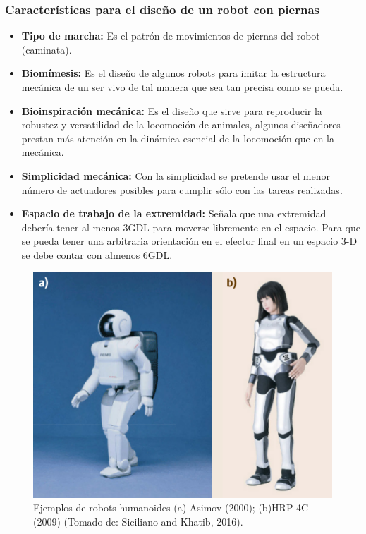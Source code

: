 			\subsubsection*{Características para el diseño de un robot con piernas}
\begin{itemize}
\item \textbf{Tipo de marcha:} Es el patrón de movimientos de piernas del robot (caminata).

\item \textbf{Biomímesis:} Es el diseño de algunos robots para imitar la estructura mecánica de un ser vivo de tal manera que sea tan precisa como se pueda.

\item \textbf{Bioinspiración mecánica:} Es el diseño que sirve para reproducir la robustez y versatilidad de la locomoción de animales, algunos diseñadores prestan más atención en la dinámica esencial de la locomoción que en la mecánica.

\item \textbf{Simplicidad mecánica:} Con la simplicidad se pretende usar el menor número de actuadores posibles para cumplir sólo con las tareas realizadas.

\item \textbf{Espacio de trabajo de la extremidad: } Señala que una extremidad debería tener al menos 3GDL para moverse libremente en el espacio. Para que se pueda tener una arbitraria orientación en el efector final en un espacio 3-D se debe contar con almenos 6GDL.

\end{itemize}

\begin{figure}
	\centering		
	\includegraphics[scale=0.5]{images/asimov_and_HRP-4C.png}
	\caption{Ejemplos de robots humanoides (a) Asimov (2000); (b)HRP-4C (2009) (Tomado de: Siciliano and Khatib, 2016).}		
\label{fig:humanoids}%
\end{figure}


